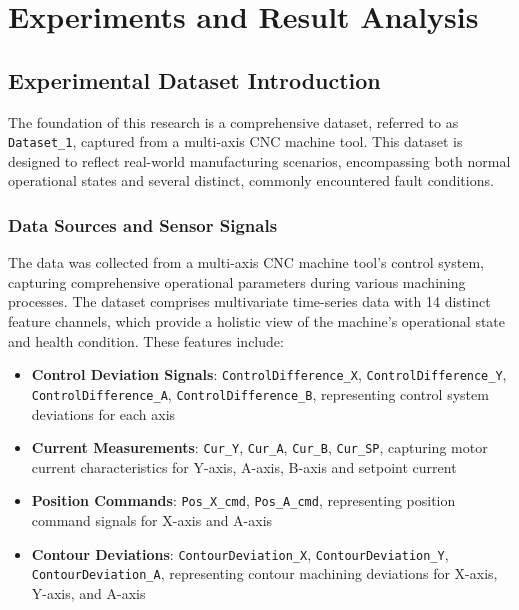 \chapter{Experiments and Result Analysis}
\label{cha:experiments}

\section{Experimental Dataset Introduction}
\label{sec:experiments:dataset}

The foundation of this research is a comprehensive dataset, referred to as \texttt{Dataset\_1}, captured from a multi-axis CNC machine tool. This dataset is designed to reflect real-world manufacturing scenarios, encompassing both normal operational states and several distinct, commonly encountered fault conditions.

\subsection{Data Sources and Sensor Signals}
The data was collected from a multi-axis CNC machine tool's control system, capturing comprehensive operational parameters during various machining processes. The dataset comprises multivariate time-series data with 14 distinct feature channels, which provide a holistic view of the machine's operational state and health condition. These features include:

\begin{itemize}
    \item \textbf{Control Deviation Signals}: \texttt{ControlDifference\_X}, \texttt{ControlDifference\_Y}, \texttt{ControlDifference\_A}, \texttt{ControlDifference\_B}, representing control system deviations for each axis
    \item \textbf{Current Measurements}: \texttt{Cur\_Y}, \texttt{Cur\_A}, \texttt{Cur\_B}, \texttt{Cur\_SP}, capturing motor current characteristics for Y-axis, A-axis, B-axis and setpoint current
    \item \textbf{Position Commands}: \texttt{Pos\_X\_cmd}, \texttt{Pos\_A\_cmd}, representing position command signals for X-axis and A-axis
    \item \textbf{Contour Deviations}: \texttt{ContourDeviation\_X}, \texttt{ContourDeviation\_Y},\newline
    \hspace*{1.5em}\texttt{ContourDeviation\_A},\newline
    representing contour machining deviations for X-axis, Y-axis, and A-axis
\end{itemize}

